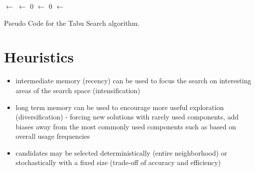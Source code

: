 \documentclass[a4paper, 11pt]{article}
\begin{document}
\begin{algorithm}[ht]
	\SetLine
	\KwIn{\TabuListSize}
	\KwOut{\Best}
	\Best $\leftarrow$ \ConstructInitialSolution{}\;
	\TabuList $\leftarrow$ 0\;
	\While{$\neg$ \StopCondition{}} {
		\CandidateList $\leftarrow$ 0\;
		\For{\Candidate $\in$ \CandidateNeighborhood}{
			\If{$\neg$ \ContainsAnyFeatures{\Candidate, \TabuList}}{
				\CandidateList $\leftarrow$ \Candidate\;
			}
		}
		\Candidate $\leftarrow$ \LocateBestCandidate{\CandidateList}\;
		\If{\Cost{\Candidate} $\leq$ \Cost{\Best}}{
			\Best $\leftarrow$ \Candidate\;
			\TabuList $\leftarrow$ \FeatureDifferences{\Candidate, \Best}\;
			\While{\TabuList $>$ \TabuListSize} {
				\DeleteFeature{\TabuList}\;
			}
		}
	}
	\Return{\Best}\;
	\caption{Pseudo Code for the Tabu Search algorithm.}
	\label{alg:tabu_search}
\end{algorithm}

\section{Heuristics}
\label{sec:heuristics}

\begin{itemize}
	\item intermediate memory (recency) can be used to focus the search on interesting areas of the search space (intensification)
	\item long term memory can be used to encourage more useful exploration (diversification) - forcing new solutions with rarely used components, add biases away from the most commonly used components such as based on overall usage frequencies
	\item candidates may be selected deterministically (entire neighborhood) or stochastically with a fixed size (trade-off of accuracy and efficiency)
\end{itemize}
\end{document}
